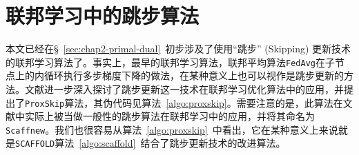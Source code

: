 \section{联邦学习中的跳步算法}
\label{sec:chap2-skip-alg}


本文已经在\S~\ref{sec:chap2-primal-dual}~初步涉及了使用``跳步'' (Skipping) 更新技术的联邦学习算法了。事实上，最早的联邦学习算法，联邦平均算法\texttt{FedAvg}\cite{mcmahan2017fed_avg}在子节点上的内循环执行多步梯度下降的做法，在某种意义上也可以视作是跳步更新的方法。文献\cite{proxskip,proxskip-vr}进一步深入探讨了跳步更新这一技术在联邦学习优化算法中的应用，并提出了\texttt{ProxSkip}算法，其伪代码见算法~\ref{algo:proxskip}。需要注意的是，此算法在文献\parencite{proxskip}中实际上被当做一般性的跳步算法在联邦学习中的应用，并将其命名为\texttt{Scaffnew}。我们也很容易从算法~\ref{algo:proxskip}~中看出，它在某种意义上来说就是\texttt{SCAFFOLD}算法~\ref{algo:scaffold}~结合了跳步更新技术的改进算法。



